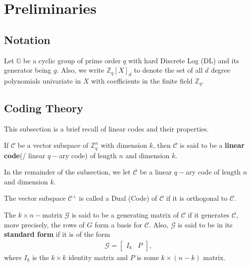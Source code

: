 \chapter{Preliminaries}
\label{chap:preliminaries}
\section{Notation}
Let $\mathbb{G}$ be a cyclic group of prime order $q$ with hard Discrete Log (DL) and its generator 
being $g$. 
Also, we write $\mathbb{Z}_{q}[X]_d$ to denote the set of all $d$ degree 
polynomials univariate in $X$ with coefficients in the finite field $\mathbb{Z}_q$. 

\section{Coding Theory}
\label{sec:linear-codes}
This subsection is a brief recall of linear codes and their properties.

\begin{definition}
  If $\mathcal{C}$ be a vector subspace of $\mathbb{Z}_q^n$ with dimension $k$, then $\mathcal{C}$ is 
  said to be a \textbf{linear code}(/ linear $q-$ary code) of length $n$ and dimension $k$.
\end{definition}

In the remainder of the subsection, we let $\mathcal{C}$ be a linear $q-$ary code of length $n$ and 
dimension $k$.

\begin{definition}
  The vector subspace $\mathcal{C}^{\perp}$ is called a Dual (Code) of $\mathcal{C}$ if it is 
  orthogonal to $\mathcal{C}$.
\end{definition}

\begin{definition}
  The $k\times n-$matrix $\mathcal{G}$ is said to be a generating matrix of $\mathcal{C}$ if it 
  generates $\mathcal{C}$, more precisely, the rows of $G$ form a basis for $\mathcal{C}$. Also, $\mathcal{G}$ is said to be in its 
  \textbf{standard form} if it is of the form
  \begin{align*}
    \mathcal{G} = \begin{bmatrix}
      I_k & P
    \end{bmatrix},
  \end{align*}
  where $I_k$ is the $k\times k$ identity matrix and $P$ is some $k\times (n-k)$ matrix.
\end{definition}

